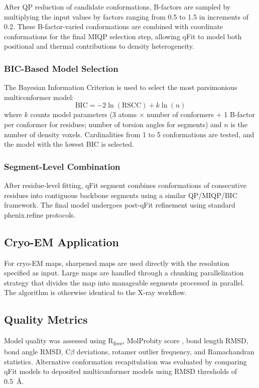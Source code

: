 \documentclass[12pt]{article}
\begin{document}
After QP reduction of candidate conformations, B-factors are sampled by multiplying the input values by factors ranging from 0.5 to 1.5 in increments of 0.2. These B-factor-varied conformations are combined with coordinate conformations for the final MIQP selection step, allowing qFit to model both positional and thermal contributions to density heterogeneity.

\subsubsection{BIC-Based Model Selection}

The Bayesian Information Criterion is used to select the most parsimonious multiconformer model:
\begin{equation}
\text{BIC} = -2 \ln(\text{RSCC}) + k \ln(n)
\end{equation}
where $k$ counts model parameters (3 atoms $\times$ number of conformers $+$ 1 B-factor per conformer for residues; number of torsion angles for segments) and $n$ is the number of density voxels. Cardinalities from 1 to 5 conformations are tested, and the model with the lowest BIC is selected.

\subsubsection{Segment-Level Combination}

After residue-level fitting, qFit segment combines conformations of consecutive residues into contiguous backbone segments using a similar QP/MIQP/BIC framework. The final model undergoes post-qFit refinement using standard phenix.refine protocols.

\subsection{Cryo-EM Application}

For cryo-EM maps, sharpened maps are used directly with the resolution specified as input. Large maps are handled through a chunking parallelization strategy that divides the map into manageable segments processed in parallel. The algorithm is otherwise identical to the X-ray workflow.

\subsection{Quality Metrics}

Model quality was assessed using R\textsubscript{free}, MolProbity score \citep{chen2010molprobity}, bond length RMSD, bond angle RMSD, C$\beta$ deviations, rotamer outlier frequency, and Ramachandran statistics. Alternative conformation recapitulation was evaluated by comparing qFit models to deposited multiconformer models using RMSD thresholds of 0.5~\AA.
\end{document}
